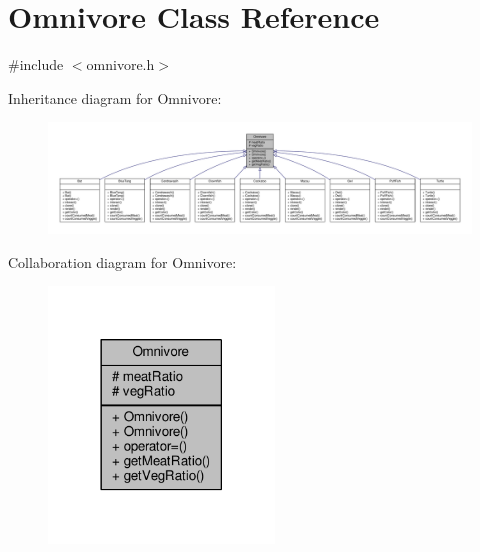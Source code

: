 \hypertarget{classOmnivore}{}\section{Omnivore Class Reference}
\label{classOmnivore}


{\ttfamily \#include $<$omnivore.\+h$>$}



Inheritance diagram for Omnivore\+:
\nopagebreak
\begin{figure}[H]
\begin{center}
\leavevmode
\includegraphics[width=350pt]{classOmnivore__inherit__graph}
\end{center}
\end{figure}


Collaboration diagram for Omnivore\+:
\nopagebreak
\begin{figure}[H]
\begin{center}
\leavevmode
\includegraphics[width=170pt]{classOmnivore__coll__graph}
\end{center}
\end{figure}
